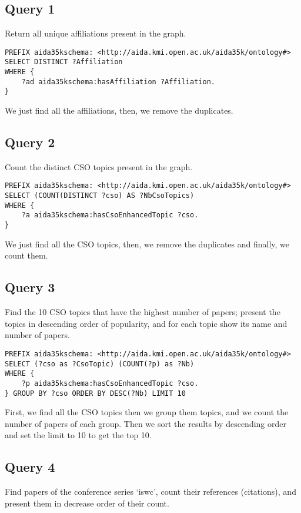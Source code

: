 \documentclass{article}[a4]
\begin{document}
\subsection{Query 1}
Return all unique affiliations present in the graph.

\begin{lstlisting}[language=SPARQL]
PREFIX aida35kschema: <http://aida.kmi.open.ac.uk/aida35k/ontology#>
SELECT DISTINCT ?Affiliation
WHERE {
    ?ad aida35kschema:hasAffiliation ?Affiliation.
}
\end{lstlisting}

We just find all the affiliations, then, we remove the duplicates.


\subsection{Query 2}
Count the distinct CSO topics present in the graph.

\begin{lstlisting}[language=SPARQL]
PREFIX aida35kschema: <http://aida.kmi.open.ac.uk/aida35k/ontology#>
SELECT (COUNT(DISTINCT ?cso) AS ?NbCsoTopics)
WHERE {
    ?a aida35kschema:hasCsoEnhancedTopic ?cso.
}
\end{lstlisting}

We just find all the CSO topics, then, we remove the duplicates and finally, we count them.

\subsection{Query 3}
Find the 10 CSO topics that have the highest number of papers; present the topics in descending order of popularity, and for each topic show its name and number of papers.

\begin{lstlisting}[language=SPARQL]
PREFIX aida35kschema: <http://aida.kmi.open.ac.uk/aida35k/ontology#>
SELECT (?cso as ?CsoTopic) (COUNT(?p) as ?Nb)
WHERE {
	?p aida35kschema:hasCsoEnhancedTopic ?cso.
} GROUP BY ?cso ORDER BY DESC(?Nb) LIMIT 10
\end{lstlisting}

First, we find all the CSO topics then we group them topics, and we count the number of papers of each group. Then we sort the results by descending order and set the limit to 10 to get the top 10.

\subsection{Query 4}
Find papers of the conference series ‘iswc’, count their references (citations), and present them in decrease order of their count.
\end{document}
